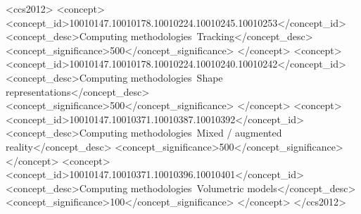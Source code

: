 %
%
\begin{CCSXML}
<ccs2012>
<concept>
<concept_id>10010147.10010178.10010224.10010245.10010253</concept_id>
<concept_desc>Computing methodologies~Tracking</concept_desc>
<concept_significance>500</concept_significance>
</concept>
<concept>
<concept_id>10010147.10010178.10010224.10010240.10010242</concept_id>
<concept_desc>Computing methodologies~Shape representations</concept_desc>
<concept_significance>500</concept_significance>
</concept>
<concept>
<concept_id>10010147.10010371.10010387.10010392</concept_id>
<concept_desc>Computing methodologies~Mixed / augmented reality</concept_desc>
<concept_significance>500</concept_significance>
</concept>
<concept>
<concept_id>10010147.10010371.10010396.10010401</concept_id>
<concept_desc>Computing methodologies~Volumetric models</concept_desc>
<concept_significance>100</concept_significance>
</concept>
</ccs2012>
\end{CCSXML}


